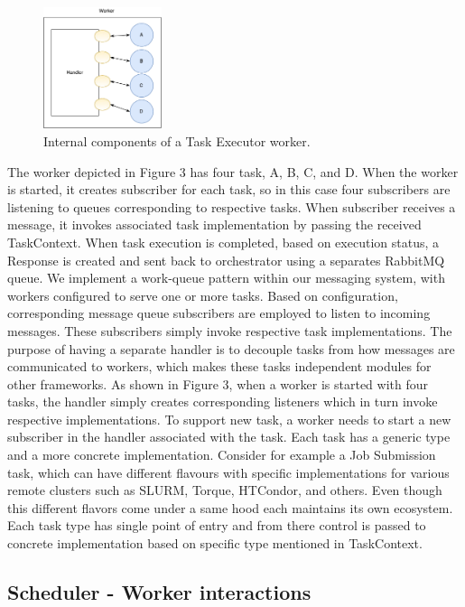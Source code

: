 \documentclass[review]{elsarticle}
\begin{document}
\begin{figure}
\includegraphics[height=1.4in, width=2.3 in]{figures/figure3.pdf}
\caption{Internal components of a Task Executor worker.}
\end{figure}

The worker depicted in Figure 3 has four task, A, B, C, and D. When the worker is started, it creates subscriber for each task, so in this case four subscribers are listening to queues corresponding to respective tasks. When subscriber receives a message, it invokes associated task implementation by passing the received TaskContext. When task execution is completed, based on execution status, a Response is created and sent back to orchestrator using a separates RabbitMQ queue.    
We implement a work-queue pattern within our messaging system, with workers configured to serve one or more tasks. Based on configuration, corresponding message queue subscribers are employed to listen to incoming messages. These subscribers simply invoke respective task implementations. The purpose of having a separate handler is to decouple tasks from how messages are communicated to workers, which makes these tasks independent modules for other frameworks. As shown in Figure 3, when a worker is started with four tasks, the handler simply creates corresponding listeners which in turn invoke respective implementations. To support new task, a worker needs to start a new subscriber in the handler associated with the task. 
Each task has a generic type and a more concrete implementation. Consider for example a Job Submission task, which can have different flavours with specific implementations for various remote clusters such as SLURM, Torque, HTCondor, and others. Even though this different flavors come under a same hood each maintains its own ecosystem. Each task type has single point of entry and from there control is passed to concrete implementation based on specific type mentioned in TaskContext. 

\subsection{Scheduler - Worker interactions}
\end{document}
